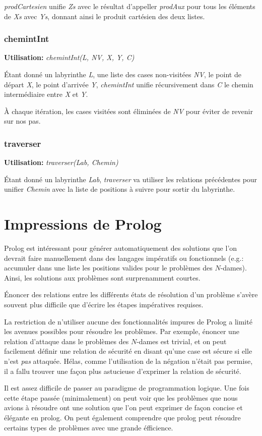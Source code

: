 \documentclass[10pt]{article}
\newcommand{\usage}[1]{\textbf{Utilisation: }\emph{#1}}
\begin{document}
\emph{prodCartesien} unifie \emph{Zs} avec le résultat d'appeller
\emph{prodAux} pour tous les éléments de \emph{Xs} avec \emph{Ys},
donnant ainsi le produit cartésien des deux listes.


\subsubsection{chemintInt}

\usage{chemintInt(L, NV, X, Y, C)}

Étant donné un labyrinthe \emph{L}, une liste des cases non-visitées
\emph{NV}, le point de départ \emph{X}, le point d'arrivée \emph{Y},
\emph{chemintInt} unifie récursivement dans \emph{C} le chemin
intermédiaire entre \emph{X} et \emph{Y}.

À chaque itération, les cases visitées sont éliminées de \emph{NV}
pour éviter de revenir sur nos pas.


\subsubsection{traverser}

\usage{traverser(Lab, Chemin)}

Étant donné un labyrinthe \emph{Lab}, \emph{traverser} va utiliser les
relations précédentes pour unifier \emph{Chemin} avec la liste de
positions à suivre pour sortir du labyrinthe.


\section{Impressions de Prolog}

Prolog est intéressant pour générer automatiquement des solutions que
l'on devrait faire manuellement dans des langages impératifs ou
fonctionnels (e.g.: accumuler dans une liste les positions valides
pour le problèmes des $N$-dames).  Ainsi, les solutions aux problèmes
sont surprenamment courtes.

Énoncer des relations entre les différents états de résolution d'un
problème s'avère souvent plus difficile que d'écrire les étapes
impératives requises.

La restriction de n'utiliser aucune des fonctionnalités impures de
Prolog a limité les avenues possibles pour résoudre les problèmes.
Par exemple, énoncer une relation d'attaque dans le problèmes des
$N$-dames est trivial, et on peut facilement définir une relation de
sécurité en disant qu'une case est sécure si elle n'est \emph{pas}
attaquée.  Hélas, comme l'utilisation de la négation n'était pas
permise, il a fallu trouver une façon plus astucieuse d'exprimer la
relation de sécurité.

Il est assez difficile de passer au paradigme de programmation logique. Une fois cette étape passée (minimalement) on peut voir que les problèmes que nous avions à résoudre ont une solution que l'on peut exprimer de façon concise et élégante en prolog. On peut également comprendre que prolog peut résoudre certains types de problèmes avec une grande éfficience.
\end{document}
